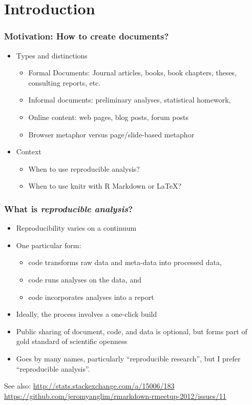 \section{Introduction}

\begin{frame}\frametitle{Motivation: How to create documents?}

\begin{itemize}
\item
  Types and distinctions

  \begin{itemize}
  \item
    Formal Documents: Journal articles, books, book chapters, theses,
    consulting reports, etc.
  \item
    Informal documents: preliminary analyses, statistical homework,
  \item
    Online content: web pages, blog posts, forum posts
  \item
    Browser metaphor versus page/slide-based metaphor
  \end{itemize}
\item
  Context

  \begin{itemize}
  \item
    When to use reproducible analysis?
  \item
    When to use knitr with R Markdown or LaTeX?
  \end{itemize}
\end{itemize}

\end{frame}

\begin{frame}\frametitle{What is \emph{reproducible analysis}?}

\begin{itemize}
\item
  Reproducibility varies on a continuum
\item
  One particular form:

  \begin{itemize}
  \item
    code transforms raw data and meta-data into processed data,
  \item
    code runs analyses on the data, and
  \item
    code incorporates analyses into a report
  \end{itemize}
\item
  Ideally, the process involves a one-click build
\item
  Public sharing of document, code, and data is optional, but forms part
  of gold standard of scientific openness
\item
  Goes by many names, particularly ``reproducible research'', but I
  prefer ``reproducible analysis''.
\end{itemize}

\tiny{
See also: \url{http://stats.stackexchange.com/a/15006/183} 
\url{https://github.com/jeromyanglim/rmarkdown-rmeetup-2012/issues/11}}

\end{frame}

